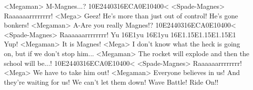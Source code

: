 <Megaman> M-Magnes...? 
{10}{E2}{44}{03}{16}{EC}{A0}{E1}{04}{00}< 
<Spade-Magnes> Raaaaaarrrrrrrr! 
<Mega> Geez! He's more than just out of control! He's gone bonkers! 
<Megaman> A-Are you really Magnes!? 
{10}{E2}{44}{03}{16}{EC}{A0}{E1}{04}{00}< 
<Spade-Magnes> Raaaaaarrrrrrrr! 
Yu {16}{E1}yu {16}{E1}yu {16}{E1}.{15}{E1}.{15}{E1}.{15}{E1} 
Yup! 
<Megaman> It is Magnes! 
<Mega> I don't know what the heck is going on, but if we don't stop him... 
<Megaman> The rocket will explode and then the school will be...! 
{10}{E2}{44}{03}{16}{EC}{A0}{E1}{04}{00}< 
<Spade-Magnes> Raaaaaarrrrrrrr! 
<Mega> We have to take him out! 
<Megaman> Everyone believes in us! And they're waiting for us! We can't let them down! 
Wave Battle! Ride On!! 
